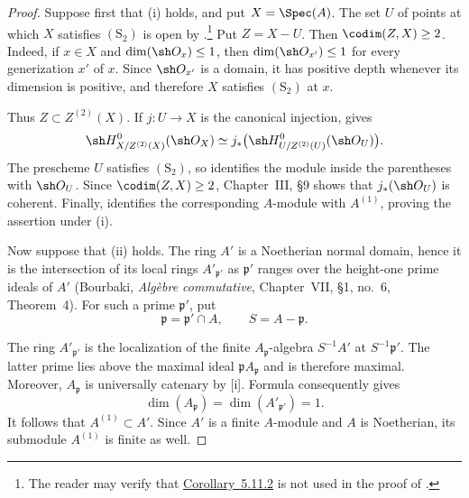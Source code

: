 \begin{proof}
Suppose first that {\rm(i)} holds, and put $X=\Spec(A)$.  The set
$U$ of points at which $X$ satisfies $(\mathrm S_2)$ is open by
.\footnote{The reader may verify that
{\hyperref[IV.5.11.2]{Corollary~5.11.2}} is not used in the proof of
.}
Put $Z=X-U$.  Then $\codim(Z,X)\geq2$.  Indeed, if
$x\in X$ and $\dim(\sh O_x)\leq1$, then
$\dim(\sh O_{x'})\leq1$ for every generization $x'$ of $x$.
Since $\sh O_{x'}$ is a domain, it has positive depth whenever
its dimension is positive, and therefore $X$ satisfies
$(\mathrm S_2)$ at $x$.

Thus $Z\subset Z^{(2)}(X)$.  If $j:U\to X$ is the canonical
injection,  gives
\[
  \sh H^0_{X/Z^{(2)}(X)}(\sh O_X)
  \simeq
  j_*\bigl(
    \sh H^0_{U/Z^{(2)}(U)}(\sh O_U)
  \bigr).
\]
The prescheme $U$ satisfies $(\mathrm S_2)$, so
 identifies the module inside the parentheses
with $\sh O_U$.  Since $\codim(Z,X)\geq2$, Chapter~III,
\S9 shows that $j_*(\sh O_U)$ is coherent.  Finally,
 identifies the corresponding $A$-module with
$A^{(1)}$, proving the assertion under {\rm(i)}.

Now suppose that {\rm(ii)} holds.  The ring $A'$ is a Noetherian
normal domain, hence it is the intersection of its local rings
$A'_{\mathfrak p'}$ as $\mathfrak p'$ ranges over the
height-one prime ideals of $A'$
(Bourbaki, \emph{Alg\`ebre commutative}, Chapter~VII,
\S1, no.~6, Theorem~4).  For such a prime $\mathfrak p'$, put
\[
  \mathfrak p=\mathfrak p'\cap A,
  \qquad
  S=A-\mathfrak p.
\]


The ring $A'_{\mathfrak p'}$ is the localization of the finite
$A_{\mathfrak p}$-algebra $S^{-1}A'$ at
$S^{-1}\mathfrak p'$.  The latter prime lies above the maximal
ideal $\mathfrak pA_{\mathfrak p}$ and is therefore maximal.
Moreover, $A_{\mathfrak p}$ is universally catenary by
[i].  Formula  consequently gives
\[
  \dim(A_{\mathfrak p})
  =\dim(A'_{\mathfrak p'})
  =1.
\]
It follows that $A^{(1)}\subset A'$.  Since $A'$ is a finite
$A$-module and $A$ is Noetherian, its submodule $A^{(1)}$ is
finite as well.
\end{proof}
